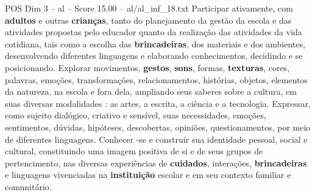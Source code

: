 \begin{textsample}{POS Dim 3 – al – Score 15.00 – al/al\_inf\_18.txt}
Participar ativamente, com \textbf{adultos} e outras \textbf{crianças}, tanto do planejamento da gestão da escola e das atividades propostas pelo educador quanto da realização das atividades da vida cotidiana, tais como a escolha das \textbf{brincadeiras}, dos materiais e dos ambientes, desenvolvendo diferentes linguagens e elaborando conhecimentos, decidindo e se posicionando.
Explorar movimentos, \textbf{gestos}, \textbf{sons}, formas, \textbf{texturas}, cores, palavras, emoções, transformações, relacionamentos, histórias, objetos, elementos da natureza, na escola e fora dela, ampliando seus saberes sobre a cultura, em suas diversas modalidades : as artes, a escrita, a ciência e a tecnologia.
Expressar, como sujeito dialógico, criativo e sensível, suas necessidades, emoções, sentimentos, dúvidas, hipóteses, descobertas, opiniões, questionamentos, por meio de diferentes linguagens.
Conhecer -se e construir sua identidade pessoal, social e cultural, constituindo uma imagem positiva de si e de seus grupos de pertencimento, nas diversas experiências de \textbf{cuidados}, interações, \textbf{brincadeiras} e linguagens vivenciadas na \textbf{instituição} escolar e em seu contexto familiar e comunitário.

\end{textsample}
